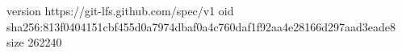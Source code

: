 version https://git-lfs.github.com/spec/v1
oid sha256:813f0404151cbf455d0a7974dbaf0a4c760daf1f92aa4e28166d297aad3eade8
size 262240
